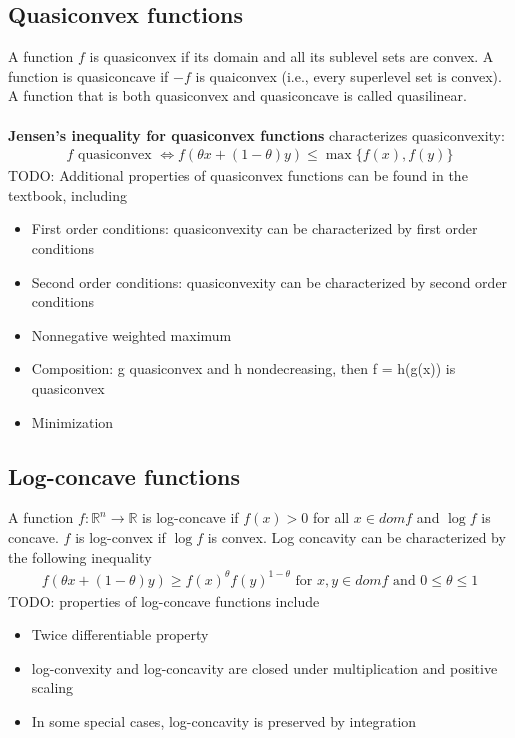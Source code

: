 \documentclass{article}
\begin{document}
\subsection{Quasiconvex functions}
A function $f$ is quasiconvex if its domain and all its sublevel sets are convex. A function is quasiconcave if $-f$ is quaiconvex (i.e., every superlevel set is convex). A function that is both quasiconvex and quasiconcave is called quasilinear.\\\\
\textbf{Jensen's inequality for quasiconvex functions} characterizes quasiconvexity:
\begin{align*}
  f \textrm{ quasiconvex } \Longleftrightarrow f(\theta x + (1-\theta)y) \leq \max \{f(x), f(y)\}
\end{align*}
TODO: Additional properties of quasiconvex functions can be found in the textbook, including
\begin{itemize}
  \item First order conditions: quasiconvexity can be characterized by first order conditions
  \item Second order conditions: quasiconvexity can be characterized by second order conditions
  \item Nonnegative weighted maximum
  \item Composition: g quasiconvex and h nondecreasing, then f = h(g(x)) is quasiconvex
  \item Minimization
\end{itemize}

\subsection{Log-concave functions}
A function $f : \mathbb{R}^n \rightarrow \mathbb{R}$ is log-concave if $f(x) > 0$ for all $x \in dom f$ and $\log f$ is concave. $f$ is log-convex if $\log f$ is convex. Log concavity can be characterized by the following inequality
\begin{align*}
  f(\theta x + (1 - \theta)y) \geq f(x)^\theta f(y)^{1-\theta} \textrm{ for } x,y\in dom f \textrm{ and } 0 \leq \theta \leq 1
\end{align*}
TODO: properties of log-concave functions include
\begin{itemize}
  \item Twice differentiable property
  \item log-convexity and log-concavity are closed under multiplication and positive scaling
  \item In some special cases, log-concavity is preserved by integration
\end{itemize}
\end{document}
